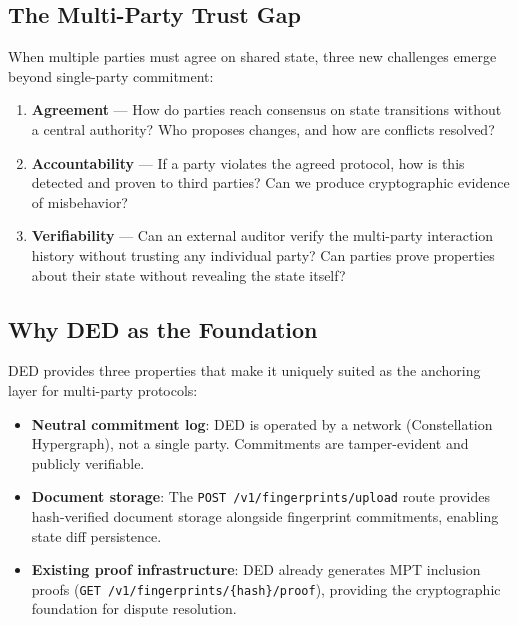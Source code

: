 \documentclass[11pt,a4paper]{article}
\begin{document}
\subsection{The Multi-Party Trust Gap}

When multiple parties must agree on shared state, three new challenges emerge
beyond single-party commitment:

\begin{enumerate}[leftmargin=2cm]
  \item \textbf{Agreement} --- How do parties reach consensus on state
    transitions without a central authority? Who proposes changes, and how are
    conflicts resolved?
  \item \textbf{Accountability} --- If a party violates the agreed protocol,
    how is this detected and proven to third parties? Can we produce
    cryptographic evidence of misbehavior?
  \item \textbf{Verifiability} --- Can an external auditor verify the
    multi-party interaction history without trusting any individual party? Can
    parties prove properties about their state without revealing the state
    itself?
\end{enumerate}

\subsection{Why DED as the Foundation}

DED provides three properties that make it uniquely suited as the anchoring
layer for multi-party protocols:

\begin{itemize}
  \item \textbf{Neutral commitment log}: DED is operated by a network
    (Constellation Hypergraph), not a single party. Commitments are
    tamper-evident and publicly verifiable.
  \item \textbf{Document storage}: The \texttt{POST /v1/fingerprints/upload}
    route provides hash-verified document storage alongside fingerprint
    commitments, enabling state diff persistence.
  \item \textbf{Existing proof infrastructure}: DED already generates MPT
    inclusion proofs (\texttt{GET /v1/fingerprints/\{hash\}/proof}),
    providing the cryptographic foundation for dispute resolution.
\end{itemize}


\end{document}
